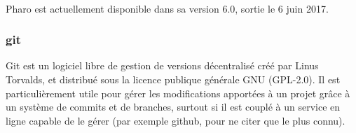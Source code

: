 	\paragraph{}
	Pharo est actuellement disponible dans sa version 6.0, sortie le 6 juin 2017.

	\subsubsection{git}
	Git est un logiciel libre de gestion de versions décentralisé créé par Linus Torvalds, et distribué sous la licence publique générale GNU (GPL-2.0). Il est particulièrement utile pour gérer les modifications apportées à un projet grâce à un système de commits et de branches, surtout si il est couplé à un service en ligne capable de le gérer (par exemple github, pour ne citer que le plus connu).

	